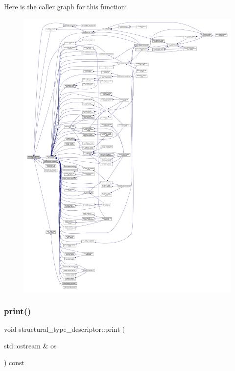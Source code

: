 Here is the caller graph for this function\+:
\nopagebreak
\begin{figure}[H]
\begin{center}
\leavevmode
\includegraphics[width=350pt]{dc/da4/structstructural__type__descriptor_a1eb64dc01fff3ab53fc01588361801f5_icgraph}
\end{center}
\end{figure}
\mbox{\label{structstructural__type__descriptor_a90759017b6c040dd29d2cdf02e89416c}} 
\subsubsection{\texorpdfstring{print()}{print()}}
{\footnotesize\ttfamily void structural\+\_\+type\+\_\+descriptor\+::print (\begin{DoxyParamCaption}\item[{std\+::ostream \&}]{os }\end{DoxyParamCaption}) const}



